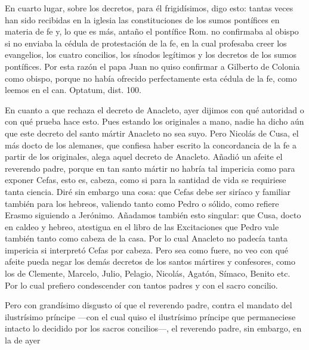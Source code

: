 En cuarto lugar, sobre los decretos, para él frigidísimos, digo esto: tantas veces han sido recibidas en la iglesia las constituciones de los sumos pontífices en materia de fe y, lo que es más, antaño el pontífice Rom. no confirmaba al obispo si no enviaba la cédula de protestación de la fe, en la cual profesaba creer los evangelios, los cuatro concilios, los sínodos legítimos y los decretos de los sumos pontífices. Por esta razón el papa Juan no quiso confirmar a Gilberto de Colonia como obispo, porque no había ofrecido perfectamente esta cédula de la fe, como leemos en el can. Optatum, dist. 100.

En cuanto a que rechaza el decreto de Anacleto, ayer dijimos con qué autoridad o con qué prueba hace esto. Pues estando los originales a mano, nadie ha dicho aún que este decreto del santo mártir Anacleto no sea suyo. Pero Nicolás de Cusa, el más docto de los alemanes, que confiesa haber escrito la concordancia de la fe a partir de los originales, alega aquel decreto de Anacleto. Añadió un afeite el reverendo padre, porque en tan santo mártir no habría tal impericia como para exponer Cefas, esto es, cabeza, como si para la santidad de vida se requiriese tanta ciencia. Diré sin embargo una cosa: que Cefas debe ser siríaco y familiar también para los hebreos, valiendo tanto como Pedro o sólido, como refiere Erasmo siguiendo a Jerónimo. Añadamos también esto singular: que Cusa, docto en caldeo y hebreo, atestigua en el libro de las Excitaciones que Pedro vale también tanto como cabeza de la casa. Por lo cual Anacleto no padecía tanta impericia si interpretó Cefas por cabeza. Pero sea como fuere, no veo con qué afeite pueda negar los demás decretos de los santos mártires y confesores, como los de Clemente, Marcelo, Julio, Pelagio, Nicolás, Agatón, Símaco, Benito etc. Por lo cual prefiero condescender con tantos padres y con el sacro concilio.

Pero con grandísimo disgusto oí que el reverendo padre, contra el mandato del ilustrísimo príncipe —con el cual quiso el ilustrísimo príncipe que permaneciese intacto lo decidido por los sacros concilios—, el reverendo padre, sin embargo, en la de ayer

